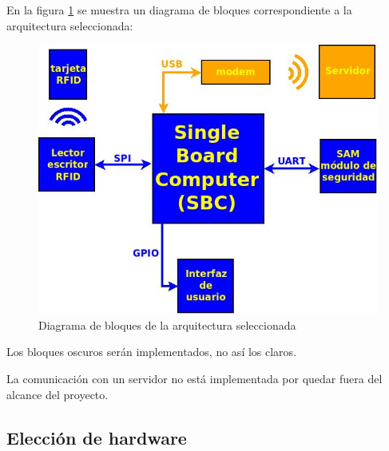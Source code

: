 \documentclass[%
        final,
        notitlepage,
        narroweqnarray,
        inline,
        ]{ieee}
\begin{document}
En la figura \ref{Fig:HW_GRAL} se muestra un diagrama de bloques correspondiente a la arquitectura seleccionada:

\begin{figure}[h]
\centering
  \begin{center}
  \includegraphics[scale=.3]{../docs/Imagenes/diagrama_rf2.jpg} 
  \end{center}
  \caption{Diagrama de bloques de la arquitectura seleccionada}\label{Fig:HW_GRAL} 
\end{figure}


Los bloques oscuros serán implementados, no así los claros.

La comunicación con un servidor no está implementada por quedar fuera del alcance del proyecto.

\subsection{Elección de hardware}
\end{document}

